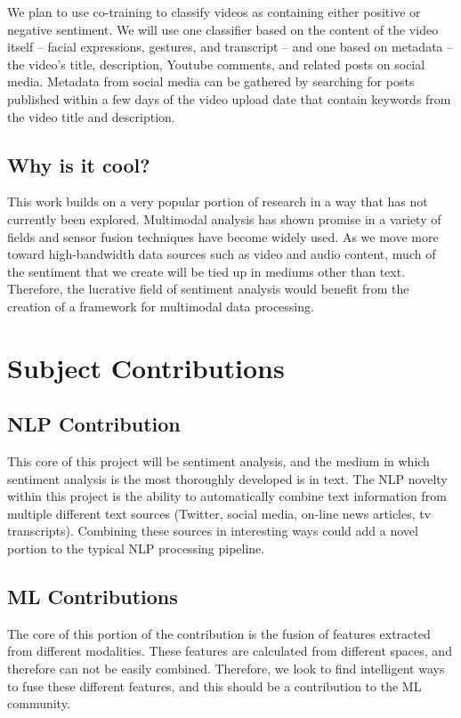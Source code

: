 \documentclass[paper=a4, fontsize=11pt]{scrartcl} %
\begin{document}
We plan to use co-training to classify videos as containing either positive or negative sentiment.
We will use one classifier based on the content of the video itself -- facial expressions, gestures, and transcript -- and one based on metadata -- the video's title, description, Youtube comments, and related posts on social media.
Metadata from social media can be gathered by searching for posts published within a few days of the video upload date that contain keywords from the video title and description.

\subsection{Why is it cool?}
This work builds on a very popular portion of research in a way that has not currently been explored. 
Multimodal analysis has shown promise in a variety of fields and sensor fusion techniques have become widely used.
As we move more toward high-bandwidth data sources such as video and audio content, much of the sentiment that we create will be tied up in mediums other than text.
Therefore, the lucrative field of sentiment analysis would benefit from the creation of a framework for multimodal data processing.

\section{Subject Contributions}
\subsection{NLP Contribution}
This core of this project will be sentiment analysis, and the medium in which sentiment analysis is the most thoroughly developed is in text.
The NLP novelty within this project is the ability to automatically combine text information from multiple different text sources (Twitter, social media, on-line news articles, tv transcripts).
Combining these sources in interesting ways could add a novel portion to the typical NLP processing pipeline.

\subsection{ML Contributions}
The core of this portion of the contribution is the fusion of features extracted from different modalities.
These features are calculated from different spaces, and therefore can not be easily combined.
Therefore, we look to find intelligent ways to fuse these different features, and this should be a contribution to the ML community.
\end{document}
